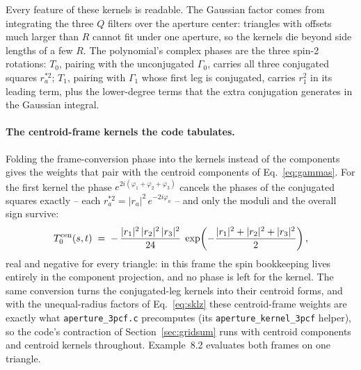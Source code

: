\documentclass[11pt]{article}
\newcommand{\us}{\_\allowbreak}
\numberwithin{equation}{section}
\begin{document}
Every feature of these kernels is readable.  The Gaussian factor
comes from integrating the three $Q$ filters over the aperture
center: triangles with offsets much larger than $R$ cannot fit
under one aperture, so the kernels die beyond side lengths of a few
$R$.  The polynomial's complex phases are the three spin-2
rotations: $T_0$, pairing with the unconjugated $\Gamma_0$, carries
all three conjugated squares $r_a^{*2}$; $T_1$, pairing with
$\Gamma_1$ whose first leg is conjugated, carries $r_1^{2}$ in its
leading term, plus the lower-degree terms that the extra
conjugation generates in the Gaussian integral.

\paragraph{The centroid-frame kernels the code tabulates.}
Folding the frame-conversion phase into the kernels instead of the
components gives the weights that pair with the centroid components
of Eq.~\eqref{eq:gammas}.  For the first kernel the phase
$e^{2i(\varphi_1 + \varphi_2 + \varphi_3)}$ cancels the phases of
the conjugated squares exactly -- each
$r_a^{*2} = |r_a|^2\, e^{-2i\varphi_a}$ -- and only the moduli and
the overall sign survive:
\begin{equation}
  T_0^{\rm cen}(s, t)
  \;=\; -\,\frac{|r_1|^2\, |r_2|^2\, |r_3|^2}{24}\;
  \exp\!\left(-\frac{|r_1|^2 + |r_2|^2 + |r_3|^2}{2}\right),
  \label{eq:t0cen}
\end{equation}
real and negative for every triangle: in this frame the spin
bookkeeping lives entirely in the component projection, and no
phase is left for the kernel.  The same conversion turns the
conjugated-leg kernels into their centroid forms, and with the
unequal-radius factors of Eq.~\eqref{eq:sklz} these centroid-frame
weights are exactly what \texttt{aperture\us 3pcf.c} precomputes
(its \texttt{aperture\us kernel\us 3pcf} helper), so the code's
contraction of Section~\ref{sec:gridsum} runs with centroid
components and centroid kernels throughout.
Example~8.2 evaluates both frames on one triangle.
\end{document}
